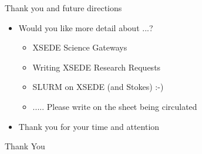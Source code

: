 \documentclass[compress,10pt]{beamer}
\begin{document}
\begin{frame}{Thank you and future directions}
\begin{itemize}
\item Would you like more detail about ...?
\begin{itemize}
\item XSEDE Science Gateways
\item Writing XSEDE Research Requests
\item SLURM on XSEDE (and Stokes) :-)
\item ..... Please write on the sheet being circulated
\end{itemize}
\pause
\item Thank you for your time and attention
\end{itemize}



\end{frame}

\begin{frame}[plain]
\begin{center}
\color{darkblue}
\huge
Thank You\\
\bigskip
\end{center} 
\end{frame}


\end{document}
